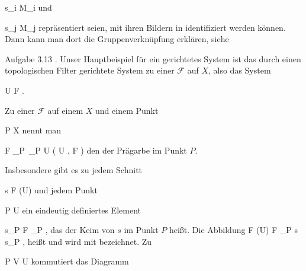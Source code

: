 \mavergleichskette
{\vergleichskette
{s_i
}
{ \in }{ M_i
}
{  }{
}
{    }{
}
{   }{
}
}
{}{}{}
und

\mavergleichskette
{\vergleichskette
{s_j
}
{ \in }{ M_j
}
{  }{
}
{    }{
}
{   }{
}
}
{}{}{}
repräsentiert seien, mit ihren Bildern in
 {} {}
identifiziert werden können. Dann kann man dort die Gruppenverknüpfung erklären, siehe

Aufgabe 3.13
.
Unser Hauptbeispiel für ein gerichtetes System ist das durch einen topologischen Filter gerichtete System zu einer
${ \mathcal F  }$ auf $X$, also das System

 {}
 {U \in F} {}
 {} {} {} {.}


{}
{





Zu einer
${ \mathcal  F   }$ auf einem
$X$ und einem Punkt

\mavergleichskette
{\vergleichskette
{ P
}
{ \in }{ X
}
{  }{
}
{    }{
}
{   }{
}
}
{}{}{}
nennt man

\mavergleichskettedisp
{\vergleichskette
{ { \mathcal  F   }_P
}
{ } { \,_{P \in U } \Gamma   \left(   U ,  { \mathcal  F   }   \right)
}
{ } {
}
{ } {
}
{ } {
}
}
{}{}{}
den
der Prägarbe im Punkt $P$.





}

Insbesondere gibt es zu jedem Schnitt

\mavergleichskette
{\vergleichskette
{ s
}
{ \in }{ { \mathcal F  } (U)
}
{  }{
}
{    }{
}
{   }{
}
}
{}{}{}
und jedem Punkt

\mavergleichskette
{\vergleichskette
{ P
}
{ \in }{ U
}
{  }{
}
{    }{
}
{   }{
}
}
{}{}{}
ein eindeutig definiertes Element

\mavergleichskette
{\vergleichskette
{ s_P
}
{ \in }{ { \mathcal F  }_P
}
{  }{
}
{    }{
}
{   }{
}
}
{}{}{,}
das der Keim von $s$ im Punkt $P$ heißt. Die Abbildung
\maabbeledisp {} { { \mathcal F  } (U) } { { \mathcal F  }_P
} {s} {s_P
} {,}
heißt  {} und wird mit
 bezeichnet. Zu

\mavergleichskette
{\vergleichskette
{P
}
{ \in }{V
}
{ \subseteq }{U
}
{    }{
}
{   }{
}
}
{}{}{}
kommutiert das Diagramm

